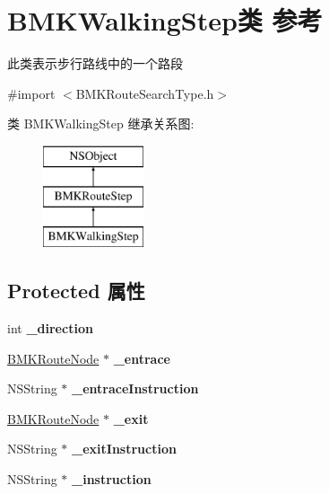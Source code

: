 \hypertarget{interface_b_m_k_walking_step}{\section{B\+M\+K\+Walking\+Step类 参考}
\label{interface_b_m_k_walking_step}
}


此类表示步行路线中的一个路段  




{\ttfamily \#import $<$B\+M\+K\+Route\+Search\+Type.\+h$>$}

类 B\+M\+K\+Walking\+Step 继承关系图\+:\begin{figure}[H]
\begin{center}
\leavevmode
\includegraphics[height=3.000000cm]{interface_b_m_k_walking_step}
\end{center}
\end{figure}
\subsection*{Protected 属性}
\begin{DoxyCompactItemize}
\item 
\hypertarget{interface_b_m_k_walking_step_ae228d2fcf96f0b45fb8d88c90ac0a36b}{int {\bfseries \+\_\+direction}}\label{interface_b_m_k_walking_step_ae228d2fcf96f0b45fb8d88c90ac0a36b}

\item 
\hypertarget{interface_b_m_k_walking_step_a50b8d5a16a9646d5843e9b8151f72486}{\hyperlink{interface_b_m_k_route_node}{B\+M\+K\+Route\+Node} $\ast$ {\bfseries \+\_\+entrace}}\label{interface_b_m_k_walking_step_a50b8d5a16a9646d5843e9b8151f72486}

\item 
\hypertarget{interface_b_m_k_walking_step_ade12c451bf711b1968ecd28e85db181b}{N\+S\+String $\ast$ {\bfseries \+\_\+entrace\+Instruction}}\label{interface_b_m_k_walking_step_ade12c451bf711b1968ecd28e85db181b}

\item 
\hypertarget{interface_b_m_k_walking_step_a7d8595edf38ee9af73fe67343ff2ac9c}{\hyperlink{interface_b_m_k_route_node}{B\+M\+K\+Route\+Node} $\ast$ {\bfseries \+\_\+exit}}\label{interface_b_m_k_walking_step_a7d8595edf38ee9af73fe67343ff2ac9c}

\item 
\hypertarget{interface_b_m_k_walking_step_a8f2654311c041ee72797647ddb53051b}{N\+S\+String $\ast$ {\bfseries \+\_\+exit\+Instruction}}\label{interface_b_m_k_walking_step_a8f2654311c041ee72797647ddb53051b}

\item 
\hypertarget{interface_b_m_k_walking_step_a9291db23fb101adb768986b2ed806894}{N\+S\+String $\ast$ {\bfseries \+\_\+instruction}}\label{interface_b_m_k_walking_step_a9291db23fb101adb768986b2ed806894}

\end{DoxyCompactItemize}
